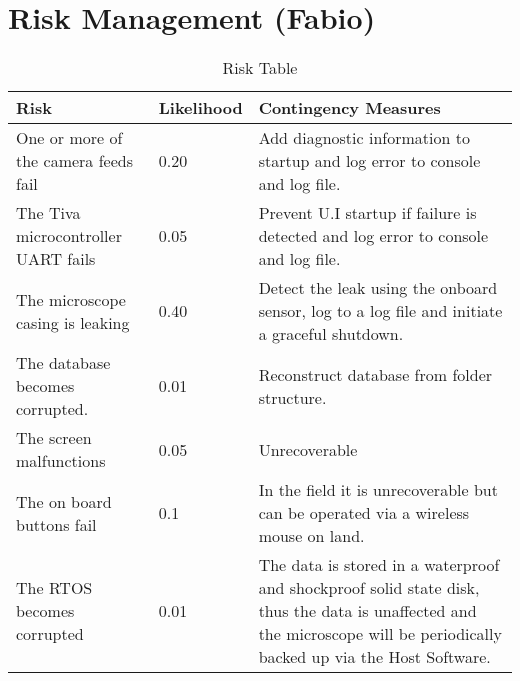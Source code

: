  \section{Risk Management (Fabio)}
 \begin{table}[H]
   \begin{tabular}{|m{}|m{}|m{}|}
     \hline
     \textbf{Risk}&\textbf{Likelihood}&\textbf{Contingency Measures}\\ \hline
     One or more of the camera feeds fail&0.20&Add diagnostic information to startup and log error to console and log file.\\ \hline
     The Tiva microcontroller UART fails&0.05&Prevent U.I startup if failure is detected and log error to console and log file.\\ \hline
     The microscope casing is leaking&0.40&Detect the leak using the onboard sensor, log to a log file and initiate a graceful shutdown. \\ \hline
     The database becomes corrupted.&0.01&Reconstruct database from folder structure.\\ \hline
     The screen malfunctions&0.05&Unrecoverable\\ \hline
     The on board buttons fail&0.1&In the field it is unrecoverable but can be operated via a wireless mouse on land.\\ \hline
     The RTOS becomes corrupted&0.01&The data is stored in a waterproof and shockproof solid state disk, thus the data is unaffected and the microscope will be periodically backed up via the Host Software.\\ \hline
   \end{tabular}
   \caption{Risk Table}
   \label{tab:RiskTable}
 \end{table}
